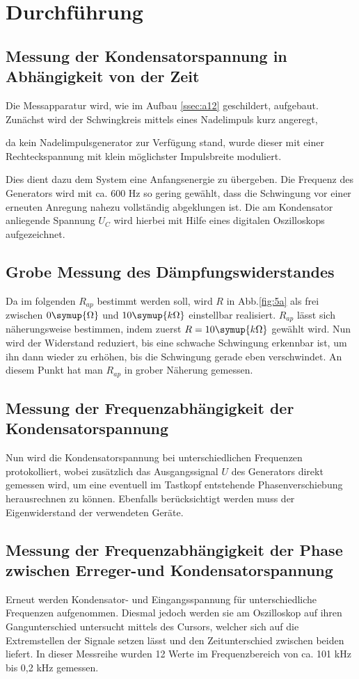 \section{Durchführung}
\label{sec:Durchführung}


\subsection{Messung der Kondensatorspannung in Abhängigkeit von der Zeit}
Die Messapparatur wird, wie im Aufbau \ref{ssec:a12} geschildert, aufgebaut.
Zunächst wird der Schwingkreis mittels eines Nadelimpuls kurz angeregt,

da kein Nadelimpulsgenerator zur Verfügung stand, wurde dieser mit einer
Rechteckspannung mit klein möglichster Impulsbreite moduliert.

Dies dient dazu dem System eine Anfangsenergie zu übergeben. Die Frequenz des
Generators wird mit ca. 600 Hz so gering gewählt, dass die Schwingung vor einer
erneuten Anregung nahezu vollständig abgeklungen ist. Die am Kondensator
anliegende Spannung $U_C$ wird hierbei mit Hilfe eines digitalen Oszilloskops
aufgezeichnet.



\subsection{Grobe Messung des Dämpfungswiderstandes}
Da im folgenden $R_{ap}$ bestimmt werden soll, wird $R$ in Abb.\ref{fig:5a} als
frei zwischen $0\symup{\Omega}$ und $10\symup{k\Omega}$ einstellbar realisiert.
$R_{ap}$ lässt
sich näherungsweise bestimmen, indem zuerst $R = 10\symup{k\Omega}$ gewählt wird. Nun
wird der Widerstand reduziert, bis eine schwache Schwingung
erkennbar ist, um ihn dann wieder zu erhöhen, bis die Schwingung
gerade eben verschwindet. An diesem Punkt hat man $R_{ap}$ in grober Näherung
gemessen.

\subsection{Messung der Frequenzabhängigkeit der Kondensatorspannung}
Nun wird die
Kondensatorspannung bei unterschiedlichen Frequenzen protokolliert, wobei
zusätzlich das Ausgangssignal $U$ des Generators direkt gemessen wird, um eine
eventuell im Tastkopf entstehende Phasenverschiebung herausrechnen zu können.
Ebenfalls berücksichtigt werden muss der Eigenwiderstand der verwendeten Geräte.

\subsection{Messung der Frequenzabhängigkeit der Phase zwischen Erreger-und Kondensatorspannung}
Erneut werden Kondensator- und Eingangsspannung für unterschiedliche Frequenzen
aufgenommen. Diesmal jedoch werden sie am Oszilloskop auf ihren Gangunterschied
untersucht mittels des Cursors, welcher sich auf die Extremstellen der Signale
setzen lässt und den Zeitunterschied zwischen beiden liefert.
In dieser Messreihe wurden 12 Werte im Frequenzbereich von ca. 101 kHz bis 0,2 kHz
gemessen.



